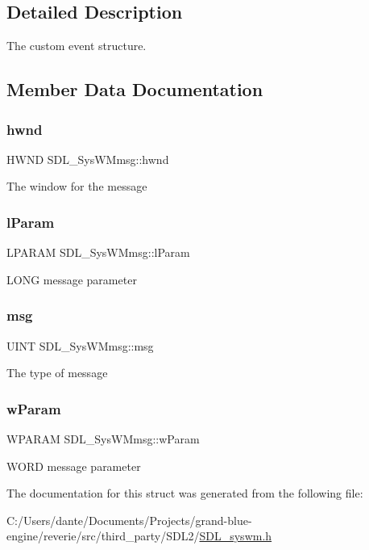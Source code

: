\subsection{Detailed Description}
The custom event structure. 

\subsection{Member Data Documentation}
\mbox{\label{struct_s_d_l___sys_w_mmsg_a55cf9583b5eddfe60a5c9851f9cce457}} 
\subsubsection{\texorpdfstring{hwnd}{hwnd}}
{\footnotesize\ttfamily H\+W\+ND S\+D\+L\+\_\+\+Sys\+W\+Mmsg\+::hwnd}

The window for the message \mbox{\label{struct_s_d_l___sys_w_mmsg_a24c1e4c3cb8d9781d34e5d99df66ac36}} 
\subsubsection{\texorpdfstring{lParam}{lParam}}
{\footnotesize\ttfamily L\+P\+A\+R\+AM S\+D\+L\+\_\+\+Sys\+W\+Mmsg\+::l\+Param}

L\+O\+NG message parameter \mbox{\label{struct_s_d_l___sys_w_mmsg_a74894ed060d5508ab06aac584154d61e}} 
\subsubsection{\texorpdfstring{msg}{msg}}
{\footnotesize\ttfamily U\+I\+NT S\+D\+L\+\_\+\+Sys\+W\+Mmsg\+::msg}

The type of message \mbox{\label{struct_s_d_l___sys_w_mmsg_a7463730478d90ebc031d83098f3f74fc}} 
\subsubsection{\texorpdfstring{wParam}{wParam}}
{\footnotesize\ttfamily W\+P\+A\+R\+AM S\+D\+L\+\_\+\+Sys\+W\+Mmsg\+::w\+Param}

W\+O\+RD message parameter 

The documentation for this struct was generated from the following file\+:\begin{DoxyCompactItemize}
\item 
C\+:/\+Users/dante/\+Documents/\+Projects/grand-\/blue-\/engine/reverie/src/third\+\_\+party/\+S\+D\+L2/\mbox{\hyperlink{_s_d_l__syswm_8h}{S\+D\+L\+\_\+syswm.\+h}}\end{DoxyCompactItemize}
